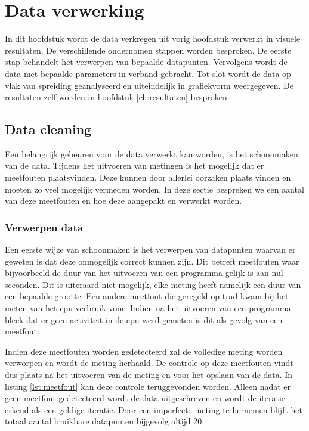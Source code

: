\chapter{Data verwerking} \label{ch:dataverwerking}
In dit hoofdstuk wordt de data verkregen uit vorig hoofdstuk verwerkt in visuele resultaten. De verschillende ondernomen stappen worden besproken. De eerste stap behandelt het verwerpen van bepaalde datapunten. Vervolgens wordt de data met bepaalde parameters in verband gebracht. Tot slot wordt de data op vlak van spreiding geanalyseerd en uiteindelijk in grafiekvorm weergegeven. De resultaten zelf worden in hoofdstuk \ref{ch:resultaten} besproken. 

\section{Data cleaning}
Een belangrijk gebeuren voor de data verwerkt kan worden, is het schoonmaken van de data. Tijdens het uitvoeren van metingen is het mogelijk dat er meetfouten plaatsvinden. Deze kunnen door allerlei oorzaken plaats vinden en moeten zo veel mogelijk vermeden worden. In deze sectie bespreken we een aantal van deze meetfouten en hoe deze aangepakt en verwerkt worden. 
	\subsection{Verwerpen data}
	Een eerste wijze van schoonmaken is het verwerpen van datapunten waarvan er geweten is dat deze onmogelijk correct kunnen zijn. Dit betreft meetfouten waar bijvoorbeeld de duur van het uitvoeren van een programma gelijk is aan nul seconden. Dit is uiteraard niet mogelijk, elke meting heeft namelijk een duur van een bepaalde grootte. Een andere meetfout die geregeld op trad kwam bij het meten van het \gls{cpu}-verbruik voor. Indien na het uitvoeren van een programma bleek dat er geen activiteit in de \gls{cpu} werd gemeten is dit als gevolg van een meetfout. 
	
	Indien deze meetfouten worden gedetecteerd zal de volledige meting worden verworpen en wordt de meting herhaald. De controle op deze meetfouten vindt dus plaats na het uitvoeren van de meting en voor het opslaan van de data. In listing \ref{lst:meetfout} kan deze controle teruggevonden worden. Alleen nadat er geen meetfout gedetecteerd wordt de data uitgeschreven en wordt de iteratie erkend als een geldige iteratie. Door een imperfecte meting te hernemen blijft het totaal aantal bruikbare datapunten bijgevolg altijd 20.
	
